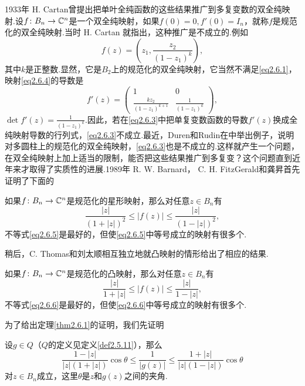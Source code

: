 1933年 H. Cartan\cite{montel1933leccons}曾提出把单叶全纯函数的这些结果推广到多复变数的双全纯映射.设$f\colon B_n\to\mathbb C^n$是一个双全纯映射，如果$f(0)=0,f'(0)=I_n$，就称$f$是规范化的双全纯映射.当时 H. Cartan 就指出，这种推广是不成立的.例如
\begin{equation}\label{eq2.6.4}
	f(z)=\left(z_1,\frac{z_2}{(1-z_1)^k}\right),
\end{equation}
其中$k$是正整数.显然，它是$B_2$上的规范化的双全纯映射，它当然不满足\eqref{eq2.6.1}，映射\eqref{eq2.6.4}的导数是
\[f'(z)=\begin{pmatrix}
	1 & 0\\
	\frac{kz_2}{(1-z_1)^{k+1}} & \frac{1}{(1-z_1)^k}
\end{pmatrix},\]
$\det f'(z)=\frac1{(1-z_1)^k}$.因此，若在\eqref{eq2.6.3}中把单复变数函数的导数$f'(z)$换成全纯映射导数的行列式，\eqref{eq2.6.3}不成立.最近，Duren和Rudin在\cite{duren1986distortion}中举出例子，说明对多圆柱上的规范化的双全纯映射，\eqref{eq2.6.3}也是不成立的.这样就产生一个问题，在双全纯映射上加上适当的限制，能否把这些结果推广到多复变？这个问题直到近年来才取得了实质性的进展.1989年 R. W. Barnard， C. H. FitzGerald和龚{昇}\cite{barnard1991growth}首先证明了下面的
\begin{theorem}\label{thm2.6.1}
	如果$f\colon B_n\to\mathbb C^n$是规范化的星形映射，那么对任意$z\in B_n$有
	\begin{equation}\label{eq2.6.5}
		\frac{|z|}{(1+|z|)^2}\le|f(z)|\le\frac{|z|}{(1-|z|)^2},
	\end{equation}
不等式\eqref{eq2.6.5}是最好的，但使\eqref{eq2.6.5}中等号成立的映射有很多个.
\end{theorem}
稍后，C. Thomas\cite{fitzgerald1990convex}和刘太顺\cite{liu1989growth}相互独立地就凸映射的情形给出了相应的结果.
\begin{theorem}\label{thm2.6.2}
	如果$f\colon B_n\to\mathbb C^n$是规范化的凸映射，那么对任意$z\in B_n$有
	\begin{equation}\label{eq2.6.6}
		\frac{|z|}{1+|z|}\le|f(z)|\le\frac{|z|}{1-|z|},
	\end{equation}
不等式\eqref{eq2.6.6}是最好的，但使\eqref{eq2.6.6}中等号成立的映射有很多个.
\end{theorem}
为了给出定理\ref{thm2.6.1}的证明，我们先证明
\begin{lemma}\label{lem2.6.3}
设$g\in Q$（$Q$的定义见定义\ref{def2.5.11}），那么
\[\frac{1-|z|}{|z|(1+|z|)}\cos\theta\le \frac1{|g(z)|}\le\frac{1+|z|}{|z|(1-|z|)}\cos\theta\]
对$z\in B_n$成立，这里$\theta$是$z$和$g(z)$之间的夹角.
\end{lemma}
